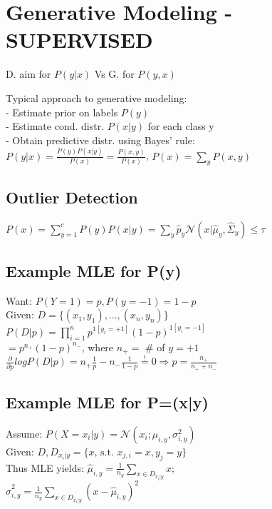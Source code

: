 \section*{Generative Modeling - SUPERVISED}
D. aim for $P(y|x)$ Vs G. for $P(y,x)$

Typical approach to generative modeling:\\
- Estimate prior on labels $P(y)$\\
- Estimate cond. distr. $P(x|y)$ for each class y\\
- Obtain predictive distr. using Bayes' rule:\\
$P(y|x) = \frac{P(y) P(x|y)}{P(x)} = \frac{P(x,y)}{P(x)}$, $P(x) = \sum_y P(x,y)$

\subsection*{Outlier Detection}
$P(x) = \sum_{y=1}^c P(y) P(x|y) = \sum_y \hat{p}_y \mathcal{N}(x|\hat{\mu}_y,\hat{\Sigma}_y) \leq \tau$


\subsection*{Example MLE for P(y)}
Want: $P(Y=1) = p, P(y=-1) = 1-p$\\
Given: $D=\{(x_1,y_1),...,(x_n,y_n)\}$\\
$P(D|p) = \prod_{i=1}^n p^{1[y_i=+1]} (1-p)^{1[y_i=-1]}$\\
$=p^{n_+} (1-p)^{n_-}$, where $n_+ = $ \# of $y=+1$\\
$\frac{\partial}{\partial p} log P(D|p) = n_+ \frac{1}{p} - n_- \frac{1}{1-p} \overset{!}{=} 0 \Rightarrow p=\frac{n_+}{n_+ + n_-}$

\subsection*{Example MLE for P=(x|y)}
Assume: $P(X=x_i|y) = \mathcal{N}(x_i;\mu_{i,y}, \sigma_{i,y}^2)$\\
Given: $D, D_{x_i|y} = \{x \text{, s.t. } x_{j,i}=x, y_j=y\}$\\
Thus MLE yields:
$\hat{\mu}_{i,y} = \frac{1}{n_y} \sum_{x\in D_{x_i|y}} x$;\\ %
$\hat{\sigma}_{i,y}^2 = \frac{1}{n_y} \sum_{x\in D_{x_i|y}} (x-\hat{\mu}_{i,y})^2$

